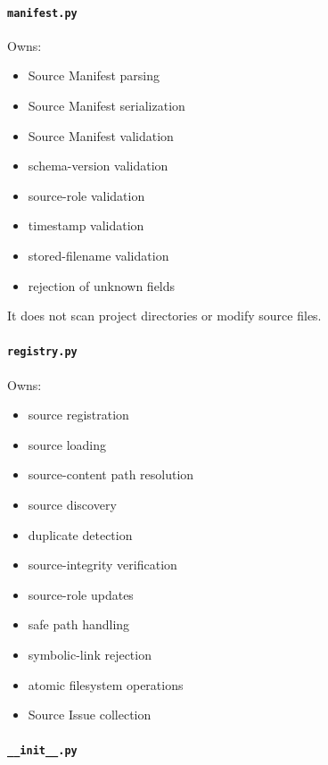 \hypertarget{manifestpy-1}{%
\paragraph{\texorpdfstring{\texttt{manifest.py}}{manifest.py}}\label{manifestpy-1}}

Owns:

\begin{itemize}
\tightlist
\item
  Source Manifest parsing
\item
  Source Manifest serialization
\item
  Source Manifest validation
\item
  schema-version validation
\item
  source-role validation
\item
  timestamp validation
\item
  stored-filename validation
\item
  rejection of unknown fields
\end{itemize}

It does not scan project directories or modify source files.

\hypertarget{registrypy}{%
\paragraph{\texorpdfstring{\texttt{registry.py}}{registry.py}}\label{registrypy}}

Owns:

\begin{itemize}
\tightlist
\item
  source registration
\item
  source loading
\item
  source-content path resolution
\item
  source discovery
\item
  duplicate detection
\item
  source-integrity verification
\item
  source-role updates
\item
  safe path handling
\item
  symbolic-link rejection
\item
  atomic filesystem operations
\item
  Source Issue collection
\end{itemize}

\hypertarget{__init__py}{%
\paragraph{\texorpdfstring{\texttt{\_\_init\_\_.py}}{\_\_init\_\_.py}}\label{__init__py}}

